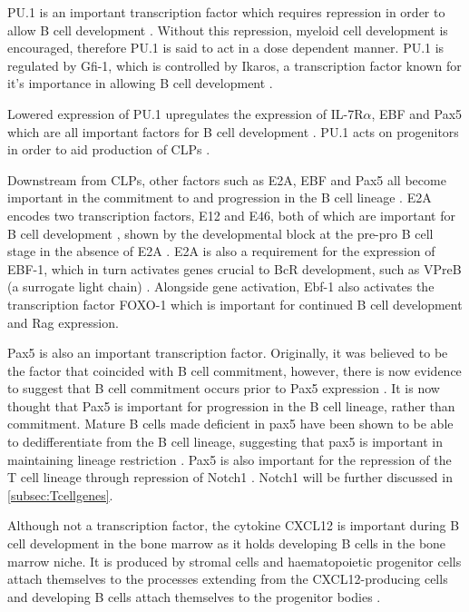 PU.1 is an important transcription factor which requires repression in order to allow B cell development \citep{Dekoter2000}. 
Without this repression, myeloid cell development is encouraged, therefore PU.1 is said to act in a dose dependent manner.
PU.1 is regulated by Gfi-1, which is controlled by Ikaros, a transcription factor known for it's importance in allowing B cell development \citep{Yoshida2006}. 

Lowered expression of PU.1 upregulates the expression of IL-7R$\alpha$, EBF and Pax5 which are all important factors for B cell development \citep{Hagman2006}.
PU.1 acts on progenitors in order to aid production of CLPs \citep{Hagman2006}.

Downstream from CLPs, other factors such as E2A, EBF and Pax5 all become important in the commitment to and progression in the B cell lineage \citep{Mansson2008}.
E2A encodes two transcription factors, E12 and E46, both of which are important for B cell development \citep{Bain1997}, shown by the developmental block at the pre-pro B cell stage in the absence of E2A \citep{Bain1994}.
E2A is also a requirement for the expression of EBF-1, which in turn activates genes crucial to BcR development, such as VPreB (a surrogate light chain) \citep{Welinder2011}.
Alongside gene activation, Ebf-1 also activates the transcription factor FOXO-1 which is important for continued B cell development and Rag expression.

Pax5 is also an important transcription factor.
Originally, it was believed to be the factor that coincided with B cell commitment, however, there is now evidence to suggest that B cell commitment occurs prior to Pax5 expression \citep{Mansson2008}.
It is now thought that Pax5 is important for progression in the B cell lineage, rather than commitment.
Mature B cells made deficient in pax5 have been shown to be able to dedifferentiate from the B cell lineage, suggesting that pax5 is important in maintaining lineage restriction \citep{Cobaleda2007}.
Pax5 is also important for the repression of the T cell lineage through repression of Notch1 \citep{Souabni2002}.
Notch1 will be further discussed in \cref{subsec:Tcellgenes}.

Although not a transcription factor, the cytokine CXCL12 is important during B cell development in the bone marrow as it holds developing B cells in the bone marrow niche.
It is produced by stromal cells and haematopoietic progenitor cells attach themselves to the processes extending from the CXCL12-producing cells and developing B cells attach themselves to the progenitor bodies \citep{Tokoyoda2004}.

